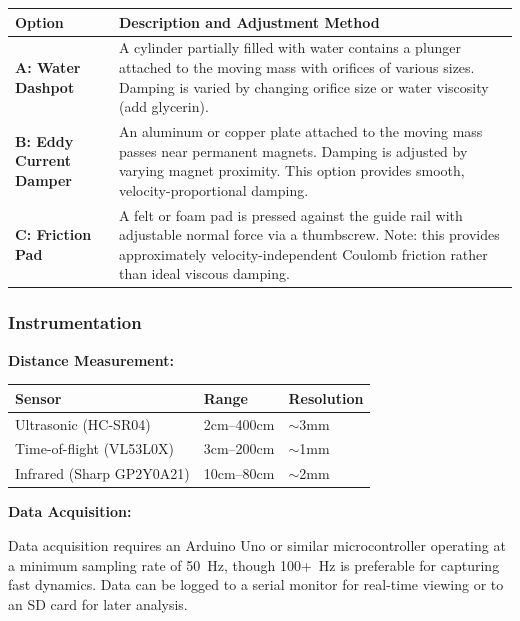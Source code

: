 \begin{center}
\begin{tabular}{lp{10cm}}
\toprule
\textbf{Option} & \textbf{Description and Adjustment Method} \\
\midrule
\textbf{A: Water Dashpot} & A cylinder partially filled with water contains a plunger attached to the moving mass with orifices of various sizes. Damping is varied by changing orifice size or water viscosity (add glycerin). \\
\addlinespace
\textbf{B: Eddy Current Damper} & An aluminum or copper plate attached to the moving mass passes near permanent magnets. Damping is adjusted by varying magnet proximity. This option provides smooth, velocity-proportional damping. \\
\addlinespace
\textbf{C: Friction Pad} & A felt or foam pad is pressed against the guide rail with adjustable normal force via a thumbscrew. Note: this provides approximately velocity-independent Coulomb friction rather than ideal viscous damping. \\
\bottomrule
\end{tabular}
\end{center}

\subsubsection{Instrumentation}

\textbf{Distance Measurement:}

\begin{center}
\begin{tabular}{lll}
\toprule
\textbf{Sensor} & \textbf{Range} & \textbf{Resolution} \\
\midrule
Ultrasonic (HC-SR04) & 2cm--400cm & $\sim$3mm \\
Time-of-flight (VL53L0X) & 3cm--200cm & $\sim$1mm \\
Infrared (Sharp GP2Y0A21) & 10cm--80cm & $\sim$2mm \\
\bottomrule
\end{tabular}
\end{center}

\textbf{Data Acquisition:}

Data acquisition requires an Arduino Uno or similar microcontroller operating at a minimum sampling rate of 50~Hz, though 100+~Hz is preferable for capturing fast dynamics. Data can be logged to a serial monitor for real-time viewing or to an SD card for later analysis.

